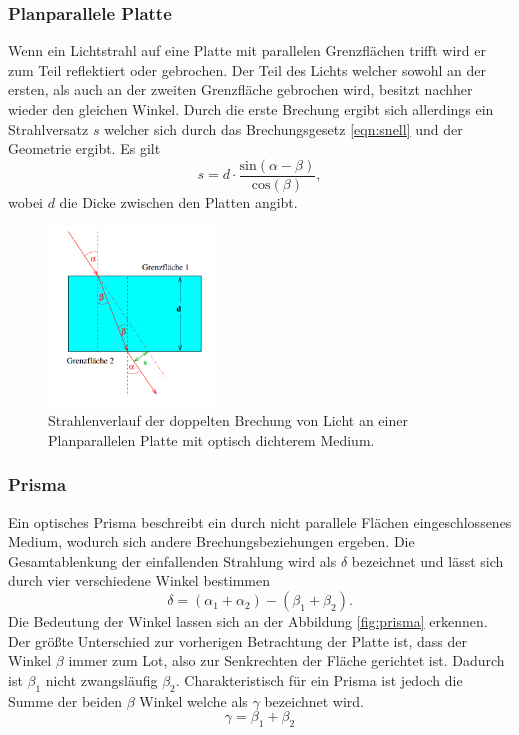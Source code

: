 \subsubsection{Planparallele Platte}
Wenn ein Lichtstrahl auf eine Platte mit parallelen Grenzflächen trifft wird er zum Teil reflektiert oder gebrochen. Der Teil des Lichts welcher sowohl an der ersten, als auch an der zweiten Grenzfläche gebrochen wird, besitzt
nachher wieder den gleichen Winkel. Durch die erste Brechung ergibt sich allerdings ein Strahlversatz $s$ welcher sich durch das Brechungsgesetz \eqref{eqn:snell} und der Geometrie ergibt. Es gilt \cite{skript}
\begin{equation}
    \label{eqn:versatz}
s = d \cdot \frac{\text{sin}(\alpha - \beta)}{\text{cos}(\beta)},
\end{equation}
wobei $d$ die Dicke zwischen den Platten angibt.
\begin{figure}
    \centering
    \includegraphics[width=0.4\textwidth]{bilder/4.png}
    \caption{Strahlenverlauf der doppelten Brechung von Licht an einer Planparallelen Platte mit optisch dichterem Medium.  \cite{skript}}
    \label{fig:planparallel}
\end{figure}
\subsubsection{Prisma}
Ein optisches Prisma beschreibt ein durch nicht parallele Flächen eingeschlossenes Medium, wodurch sich andere Brechungsbeziehungen ergeben. Die Gesamtablenkung der einfallenden Strahlung wird als $\delta$ bezeichnet und 
lässt sich durch vier verschiedene Winkel bestimmen \cite{skript}
\begin{equation}
    \label{eqn:deltaw}
\delta = (\alpha_1 + \alpha_2) - (\beta_1 + \beta_2).
\end{equation}
Die Bedeutung der Winkel lassen sich an der Abbildung \ref{fig:prisma} erkennen. Der größte Unterschied zur vorherigen Betrachtung der Platte ist, dass der Winkel $\beta$ immer zum Lot, also zur Senkrechten der Fläche gerichtet ist. Dadurch ist $\beta_1$ nicht zwangsläufig $\beta_2$.
Charakteristisch für ein Prisma ist jedoch die Summe der beiden $\beta$ Winkel welche als $\gamma$ bezeichnet wird.
\begin{equation*}
\gamma = \beta_1 + \beta_2
\end{equation*}

